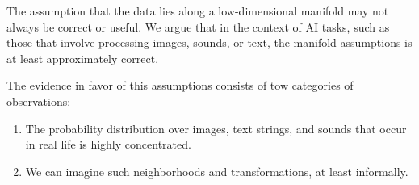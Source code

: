 The assumption that the data lies along a low-dimensional manifold may not always be correct or useful.
We argue that in the context of AI tasks, such as those that involve processing images, sounds, or text,
the manifold assumptions is at least approximately correct.

The evidence in favor of this assumptions consists of tow categories of observations:
\begin{enumerate}
\item The probability distribution over images, text strings, and sounds that occur in real life is highly concentrated.
\item We can imagine such neighborhoods and transformations, at least informally.
\end{enumerate}


